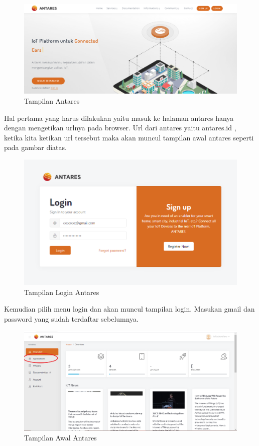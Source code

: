 \begin{enumerate}
     \begin{figure}[H]
    \centering
    \includegraphics[width=1\textwidth]{figures/antares2.png}
    \caption{Tampilan Antares}
    \label{print}
    \end{figure}
    
    \par Hal pertama yang harus dilakukan yaitu masuk ke halaman antares hanya dengan mengetikan urlnya pada browser. Url dari antares yaitu antares.id , ketika kita ketikan url tersebut maka akan muncul tampilan awal antares seperti pada gambar diatas.
    \begin{figure}[H]
    \centering
    \includegraphics[width=1\textwidth]{figures/antares5.png}
    \caption{Tampilan Login Antares}
    \label{print}
    \end{figure}

    \par Kemudian pilih menu login dan akan muncul tampilan login. Masukan gmail dan password yang sudah terdaftar sebelumnya.
    \begin{figure}[H]
    \centering
    \includegraphics[width=1\textwidth]{figures/project1.png}
    \caption{Tampilan Awal Antares}
    \label{print}
    \end{figure}
    

\end{enumerate}
